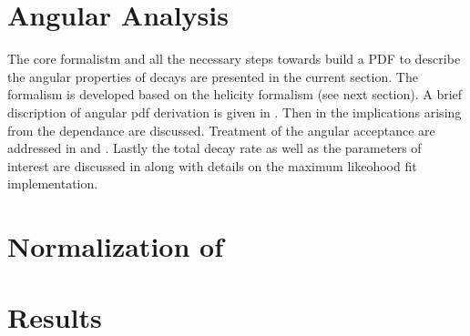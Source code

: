 

\section{Angular Analysis}
\label{Angular_Analysis}
 
The core formalistm and all the necessary steps towards build a PDF to describe the angular properties of \BJpsiKst decays are presented in
the current section. The formalism is developed based on the helicity formalism (see next section). A brief discription of 
angular pdf derivation is given in . Then in  the implications arising from the
\mkpi dependance are discussed. Treatment of the angular acceptance are addressed in  and .
Lastly the total decay rate as well as the \ACP parameters of interest are discussed in  along with details
on the maximum likeohood fit implementation.



\section{Normalization of \BsJpsiKpi}
\label{Normalization}

\section{Results}
\label{Results}


